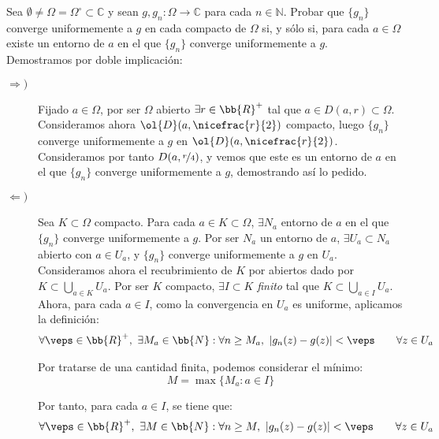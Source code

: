 \documentclass[12pt]{article}
\begin{document}
    \begin{ejercicio}
        Sea $\emptyset\neq \Omega=\Omega^\circ \subset \mathbb{C}$ y sean $g, g_n : \Omega \to \mathbb{C}$ para cada $n \in \mathbb{N}$. Probar que $\{g_n\}$ converge uniformemente a $g$ en cada compacto de $\Omega$ si, y sólo si, para cada $a \in \Omega$ existe un entorno de $a$ en el que $\{g_n\}$ converge uniformemente a $g$.\\
        
        Demostramos por doble implicación:
        \begin{description}
            \item[$\Longrightarrow)$] Fijado $a\in \Omega$, por ser $\Omega$ abierto $\exists r\in \bb{R}^+$ tal que $a\in D(a,r)\subset \Omega$. Consideramos ahora $\ol{D}(a,\nicefrac{r}{2})$ compacto, luego $\{g_n\}$ converge uniformemente a $g$ en $\ol{D}(a,\nicefrac{r}{2})$. Consideramos por tanto $D(a,\nicefrac{r}{4})$, y vemos que este es un entorno de $a$ en el que $\{g_n\}$ converge uniformemente a $g$, demostrando así lo pedido.
            
            \item[$\Longleftarrow)$] Sea $K\subset \Omega$ compacto. Para cada $a\in K\subset \Omega$, $\exists N_a$ entorno de $a$ en el que $\{g_n\}$ converge uniformemente a $g$. Por ser $N_a$ un entorno de $a$, $\exists U_a\subset N_a$ abierto con $a\in U_a$, y $\{g_n\}$ converge uniformemente a $g$ en $U_a$.\\
            
            Consideramos ahora el recubrimiento de $K$ por abiertos dado por $K\subset \bigcup\limits_{a\in K} U_a$. Por ser $K$ compacto, $\exists I\subset K$ \emph{finito} tal que $K\subset \bigcup\limits_{a\in I} U_a$. Ahora, para cada $a\in I$, como la convergencia en $U_a$ es uniforme, aplicamos la definición:
            \begin{align*}
                \forall \veps\in \bb{R}^+,\ \exists M_a\in \bb{N} : \forall n\geq M_a,\ |g_n(z)-g(z)|<\veps\qquad \forall z\in U_a
            \end{align*}

            Por tratarse de una cantidad finita, podemos considerar el mínimo:
            \begin{equation*}
                M=\max\{M_a : a\in I\}
            \end{equation*}

            Por tanto, para cada $a\in I$, se tiene que:
            \begin{align*}
                \forall \veps\in \bb{R}^+,\ \exists M\in \bb{N} : \forall n\geq M,\ |g_n(z)-g(z)|<\veps\qquad \forall z\in U_a
            \end{align*}


\end{description}
\end{ejercicio}
\end{document}
